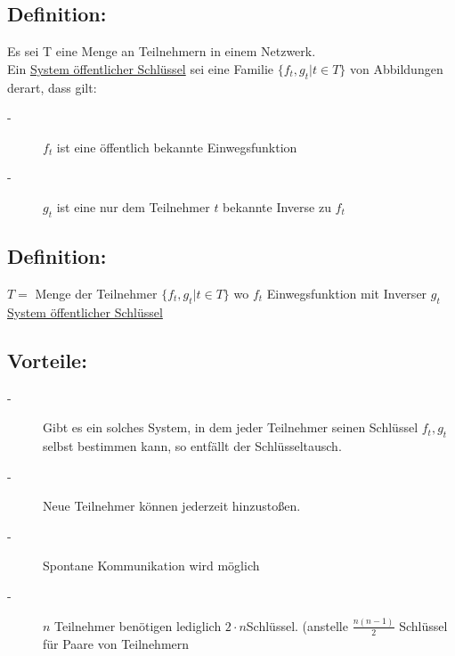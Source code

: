 \subsection{Definition:}
Es sei T eine Menge an Teilnehmern in einem Netzwerk.\\
Ein \underline{System öffentlicher Schlüssel} sei eine Familie $\{f_{t},g_{t}|t\in T\}$ von Abbildungen derart, dass gilt:
\begin{description}
	\item[-] $f_{t}$ ist eine öffentlich bekannte Einwegsfunktion
	\item[-] $g_{t}$ ist eine nur dem Teilnehmer $t$ bekannte Inverse zu $f_{t}$
\end{description}
%
%
%
\subsection{Definition:}
$T =$ Menge der Teilnehmer $ \{f_{t}, g_{t}|t \in T\}$ wo $f_{t}$ Einwegsfunktion mit Inverser $g_{t}$\\
 \underline{ System öffentlicher Schlüssel}
%
%
%
\subsection{Vorteile:}
\begin{description}
	\item[-] Gibt es ein solches System, in dem jeder Teilnehmer seinen Schlüssel $f_{t}, g_{t}$ selbst bestimmen kann, so entfällt der Schlüsseltausch.
	\item[-] Neue Teilnehmer können jederzeit hinzustoßen.
	\item[-] Spontane Kommunikation wird möglich
	\item[-] $n$ Teilnehmer benötigen lediglich $2\cdot n$Schlüssel. (anstelle $\frac{n(n-1)}{2}$ Schlüssel für Paare von Teilnehmern
\end{description}
%
%
%
